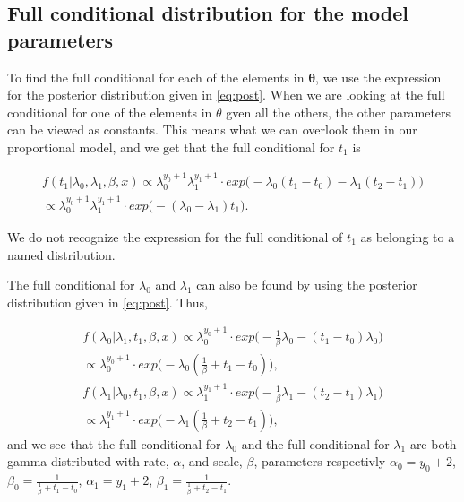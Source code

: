 \subsection{Full conditional distribution for the model parameters} \label{full_cond}

To find the full conditional for each of the elements in $\boldsymbol{\theta}$, we use the expression for the posterior distribution given in \eqref{eq:post}. When we are looking at the full conditional for one of the elements in $\theta$ gven all the others, the other parameters can be viewed as constants. This means what we can overlook them in our proportional model, and we get that the full conditional for $t_1$ is

\begin{align}
    f(t_1 | \lambda_0, \lambda_1, \beta, x) \propto 
    \lambda_0^{y_0 + 1} \lambda_1^{y_1 + 1} \cdot exp \Big( -\lambda_0(t_1 - t_0) - \lambda_1 (t_2 - t_1) \Big) \nonumber \\
    \propto  \lambda_0^{y_0 + 1} \lambda_1^{y_1 + 1} \cdot exp \Big( -(\lambda_0 - \lambda_1)t_1 \Big).
\end{align}

We do not recognize the expression for the full conditional of $t_1$ as belonging to a named distribution. 

The full conditional for $\lambda_0$ and $\lambda_1$ can also be found by using the posterior distribution given in \eqref{eq:post}. Thus, 

\begin{align}
    f(\lambda_0 | \lambda_1, t_1, \beta, x) \propto
    \lambda_0^{y_0 + 1}\cdot exp \Big( -\frac{1}{\beta} \lambda_0 - (t_1 - t_0)\lambda_0 \Big) 
    \nonumber \\
    \propto  \lambda_0^{y_0 + 1} \cdot exp \Big( - \lambda_0 (\frac{1}{\beta} + t_1 - t_0) \Big),
     \\
    f(\lambda_1 | \lambda_0, t_1, \beta, x) \propto
    \lambda_1^{y_1 + 1}\cdot exp \Big( -\frac{1}{\beta} \lambda_1 - (t_2 - t_1)\lambda_1 \Big) \nonumber \\
    \propto  \lambda_1^{y_1 + 1} \cdot exp \Big( - \lambda_1 (\frac{1}{\beta} + t_2 - t_1) \Big),
\end{align}
and we see that the full conditional for $\lambda_0$ and the full conditional for $\lambda_1$ are both gamma distributed with rate, $\alpha$, and scale, $\beta$, parameters respectivly $\alpha_0 = y_0 + 2$, $\beta_0 = \frac{1}{\frac{1}{\beta} + t_1 - t_0}$, $\alpha_1 = y_1 + 2$, $\beta_1 = \frac{1}{\frac{1}{\beta} + t_2 - t_1}$. 




